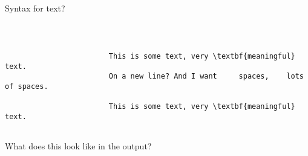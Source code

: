 \copyrightVincent

\begin{frame}[fragile]{Syntax for text?}
    \begin{columns}
        \begin{column}{0.8\textwidth}
            \begin{adjustbox}{frame=1pt 5pt,valign=t}%
                \begin{minipage}{\textwidth}%
                    \begin{verbatim} 
                        
                        
                        This is some text, very \textbf{meaningful} text.
                        On a new line? And I want     spaces,    lots of spaces.

                        This is some text, very \textbf{meaningful} text.
                        
                    \end{verbatim}
                \end{minipage}
            \end{adjustbox}

            \centering
            \bigskip
            What does this look like in the output?
        \end{column}





\end{columns}
\end{frame}
